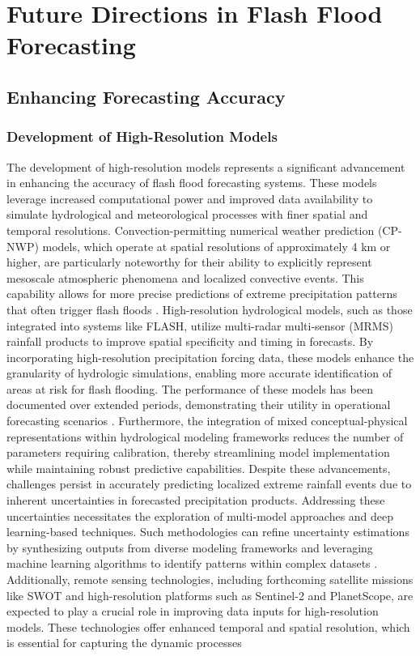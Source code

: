\section{Future Directions in Flash Flood Forecasting}

\subsection{Enhancing Forecasting Accuracy}

\subsubsection{Development of High-Resolution Models}
The development of high-resolution models represents a significant advancement in enhancing the accuracy of flash flood forecasting systems. These models leverage increased computational power and improved data availability to simulate hydrological and meteorological processes with finer spatial and temporal resolutions. Convection-permitting numerical weather prediction (CP-NWP) models, which operate at spatial resolutions of approximately 4 km or higher, are particularly noteworthy for their ability to explicitly represent mesoscale atmospheric phenomena and localized convective events. This capability allows for more precise predictions of extreme precipitation patterns that often trigger flash floods \citep{Zanchetta2020}. High-resolution hydrological models, such as those integrated into systems like FLASH, utilize multi-radar multi-sensor (MRMS) rainfall products to improve spatial specificity and timing in forecasts. By incorporating high-resolution precipitation forcing data, these models enhance the granularity of hydrologic simulations, enabling more accurate identification of areas at risk for flash flooding. The performance of these models has been documented over extended periods, demonstrating their utility in operational forecasting scenarios \citep{Flamig2020}. Furthermore, the integration of mixed conceptual-physical representations within hydrological modeling frameworks reduces the number of parameters requiring calibration, thereby streamlining model implementation while maintaining robust predictive capabilities. Despite these advancements, challenges persist in accurately predicting localized extreme rainfall events due to inherent uncertainties in forecasted precipitation products. Addressing these uncertainties necessitates the exploration of multi-model approaches and deep learning-based techniques. Such methodologies can refine uncertainty estimations by synthesizing outputs from diverse modeling frameworks and leveraging machine learning algorithms to identify patterns within complex datasets \citep{Msigwa2024}. Additionally, remote sensing technologies, including forthcoming satellite missions like SWOT and high-resolution platforms such as Sentinel-2 and PlanetScope, are expected to play a crucial role in improving data inputs for high-resolution models. These technologies offer enhanced temporal and spatial resolution, which is essential for capturing the dynamic processes 